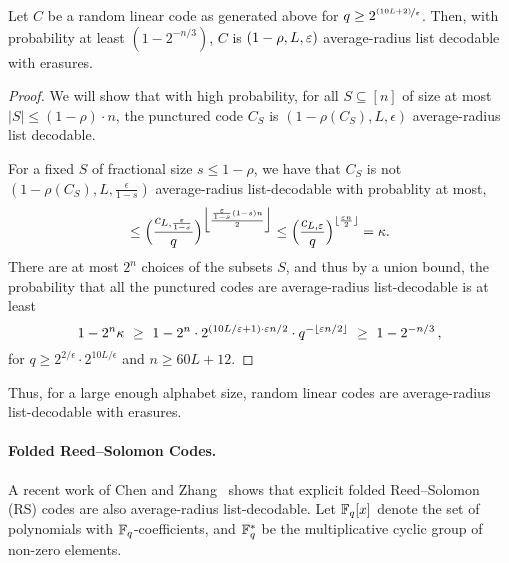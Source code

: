\begin{corollary}\label{cor:random-code}
Let $C$ be a random linear code as generated above for $q \geq 2^{\nfrac{(10L+2)}{\epsilon}}$. Then,
with probability at least $(1-2^{-n/3})$, $C$ is $(1-\rho,L,\eps)$ average-radius list decodable with erasures.\end{corollary}
\begin{proof}
We will show that with high probability, for all $S \subseteq [n]$ of size at most $|S| \leq (1-\rho)\cdot n$, the punctured code $C_S$ is $ (1-\rho(C_S), L, \epsilon)$ average-radius list decodable. 

For a fixed $S$ of fractional size  $s \leq 1-\rho$, we have that $C_S$ is not
$(1-\rho(C_S),L,\frac{\epsilon}{1-s})$ average-radius list-decodable with probablity at most, 
%
\[
\leq \parens[\Big]{\frac{c_{L,\frac{\epsilon}{1-s}}}{q}}^{\Big\lfloor \frac{ \frac{\epsilon}{1-s}
      (1- s) n}{2}\Big\rfloor} \leq \parens[\Big]{\frac{c_{L,\eps}}{q}}^{\lfloor\frac{ \eps
      n}{2}\rfloor} = \kappa .
\] 
There are at most $2^n$ choices of the subsets $S$, and thus by a union bound, the probability that
all the punctured codes are average-radius list-decodable is at least 
\[
1 - 2^{n} \kappa ~\geq~ 1 - 2^n \cdot 2^{(10L/\eps + 1) \cdot \eps n/2} \cdot q^{-\lfloor\eps
  n/2\rfloor } ~\geq~ 1 - 2^{-n/3} \mcom
\]
for $q \geq 2^{2/\epsilon}\cdot 2^{10L/\epsilon}$ and $n \geq 60L+12$. 	
\end{proof}



Thus, for a large enough alphabet size, random linear codes are average-radius list-decodable with erasures.


\vspace{-5 pt}
\paragraph{Folded Reed--Solomon Codes.} A recent work of Chen and Zhang~\cite{CZ24} shows that explicit folded Reed--Solomon (RS) codes are also average-radius list-decodable. Let $\F_q[x]$ denote the set of polynomials with $\F_q$-coefficients, and $\F_q^*$ be the multiplicative cyclic group of non-zero elements. 

